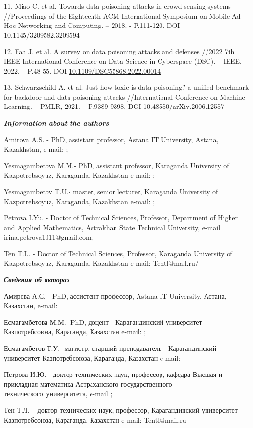 11. Miao C. et al. Towards data poisoning attacks in crowd sensing
systems //Proceedings of the Eighteenth ACM International Symposium on
Mobile Ad Hoc Networking and Computing. -- 2018. - P.111-120. DOI
10.1145/3209582.3209594

12. Fan J. et al. A survey on data poisoning attacks and defenses //2022
7th IEEE International Conference on Data Science in Cyberspace (DSC).
-- IEEE, 2022. -- P.48-55. DOI
\href{http://dx.doi.org/10.1109/DSC55868.2022.00014}{10.1109/DSC55868.2022.00014}

13. Schwarzschild A. et al. Just how toxic is data poisoning? a unified
benchmark for backdoor and data poisoning attacks //International
Conference on Machine Learning. -- PMLR, 2021. -- P.9389-9398. DOI
10.48550/arXiv.2006.12557

\emph{{\bfseries Information about the authors}}

Amirova A.S. - PhD, assistant professor, Astana IT University, Astana,
Kazakhstan, e-mail:
\href{mailto:akzhibek.amirova@astanait.edu.kz}{};

Yesmagambetova M.M.- PhD, assistant professor, Karaganda University of
Kazpotrebsoyuz, Karaganda, Kazakhstan e-mail:
\href{mailto:marzhan1983@mail.ru}{};

Yesmagambetov T.U.- master, senior lecturer, Karaganda University of
Kazpotrebsoyuz, Karaganda, Kazakhstan e-mail:
\href{mailto:Timur198300@mail.ru}{};

Petrova I.Yu. - Doctor of Technical Sciences, Professor, Department of
Higher and Applied Mathematics, Astrakhan State Technical University,
e-mail irina.petrova1011@gmail.com;

Ten T.L. - Doctor of Technical Sciences, Professor, Karaganda University
of Kazpotrebsoyuz, Karaganda, Kazakhstan e-mail: Tentl@mail.ru/

\emph{{\bfseries Сведения об авторах}}

Амирова А.С. - PhD, ассистент профессор, Astana IT University, Астана,
Казахстан, e-mail:


Есмагамбетова М.М.- PhD, доцент - Карагандинский университет
Казпотребсоюза, Караганда, Казахстан e-mail:
\href{mailto:marzhan1983@mail.ru}{};

Есмагамбетов Т.У.- магистр, старший преподаватель - Карагандинский
университет Казпотребсоюза, Караганда, Казахстан e-mail:


Петрова И.Ю. - доктор технических наук, профессор, кафедра Высшая и
прикладная математика Астраханского государственного
технического~университета, e-mail
\href{mailto:irina.petrova1011@gmail.com}{};

Тен Т.Л. -- доктор технических наук, профессор, Карагандинский
университет Казпотребсоюза, Караганда, Казахстан e-mail: Tentl@mail.ru